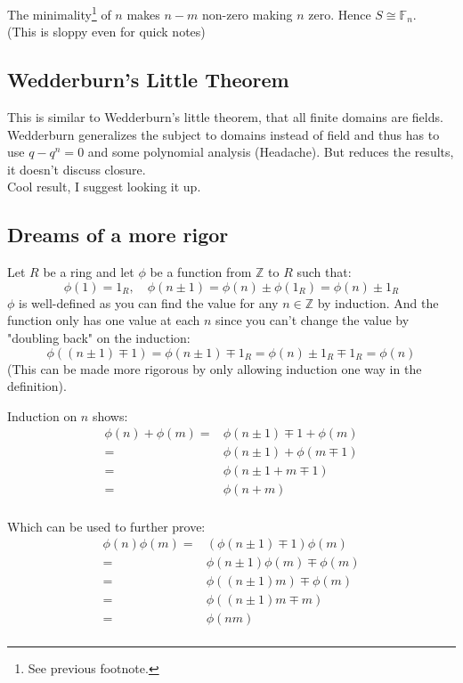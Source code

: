 The minimality\footnote{See previous footnote.} of $n$ makes $n-m$ non-zero making $n$ zero.
Hence $S\cong\mathbb{F}_{n}$.
\\

(This is sloppy even for quick notes)

\subsection{Wedderburn's Little Theorem}
This is similar to Wedderburn's little theorem, 
that all finite domains are fields.
Wedderburn generalizes the subject to domains instead of field and thus has to use $q-q^n = 0$ and some polynomial analysis (Headache).
But reduces the results,
it doesn't discuss closure.
\\

Cool result,
I suggest looking it up.

\subsection{Dreams of a more rigor}
Let $R$ be a ring and let $\phi$ be a function from $\mathbb{Z}$ to $R$ such that:
\[\phi(1)=1_R,\quad \phi(n\pm 1) = \phi(n)\pm \phi(1_R)= \phi(n)\pm 1_R\]
$\phi$ is well-defined as you can find the value for any $n\in\mathbb{Z}$ by induction.
And the function only has one value at each $n$ since you can't change the value by "doubling back" on the induction:
\[\phi((n\pm 1)\mp 1) = \phi(n\pm 1)\mp 1_R = \phi(n)\pm 1_R\mp 1_R = \phi(n)\]
(This can be made more rigorous by only allowing induction one way in the definition).

Induction on $n$ shows:
\begin{equation*}
\begin{aligned}
	\phi(n)+\phi(m) =& \phi(n\pm 1)\mp 1 +\phi(m) \\
	=& \phi(n\pm 1)+\phi(m\mp 1) \\
	=& \phi(n\pm 1 + m\mp 1) \\
	=& \phi(n+m) \\
\end{aligned}
\end{equation*}

Which can be used to further prove:
\begin{equation*}
\begin{aligned}
	\phi(n)\phi(m) =&(\phi(n\pm 1)\mp 1)\phi(m) \\
	=&\phi(n\pm 1)\phi(m)\mp\phi(m) \\
	=&\phi((n\pm 1)m)\mp\phi(m) \\
	=&\phi((n\pm 1)m\mp m) \\
	=&\phi(nm)\\
\end{aligned}
\end{equation*}

